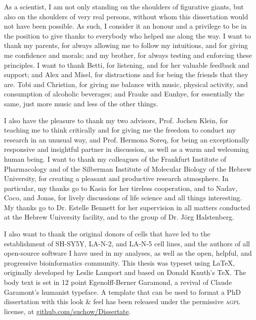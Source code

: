 
As a scientist, I am not only standing on the shoulders of figurative giants, but also on the shoulders of very real persons, without whom this dissertation would not have been possible. As such, I consider it an honour and a privilege to be in the position to give thanks to everybody who helped me along the way. I want to thank my parents, for always allowing me to follow my intuitions, and for giving me confidence and morals; and my brother, for always testing and enforcing these principles. I want to thank Betti, for listening, and for her valuable feedback and support; and Alex and Misel, for distractions and for being the friends that they are. Tobi and Christian, for giving me balance with music, physical activity, and consumption of alcoholic beverages; and Frauke and Eunhye, for essentially the same, just more music and less of the other things.

I also have the pleasure to thank my two advisors, Prof. Jochen Klein, for teaching me to think critically and for giving me the freedom to conduct my research in an unusual way, and Prof. Hermona Soreq, for being an exceptionally responsive and insightful partner in discussion, as well as a warm and welcoming human being. I want to thank my colleagues of the Frankfurt Institute of Pharmacology and of the Silberman Institute of Molecular Biology of the Hebrew University, for creating a pleasant and productive research atmosphere. In particular, my thanks go to Kasia for her tireless cooperation, and to Nadav, Coco, and Jonas, for lively discussions of life science and all things interesting. My thanks go to Dr. Estelle Bennett for her supervision in all matters conducted at the Hebrew University facility, and to the group of Dr. Jörg Halstenberg.

I also want to thank the original donors of cells that have led to the establishment of SH-SY5Y, LA-N-2, and LA-N-5 cell lines, and the authors of all open-source software I have used in my analyses, as well as the open, helpful, and progressive bioinformatics community. This thesis was typeset using \LaTeX, originally developed by Leslie Lamport and based on Donald Knuth's \TeX. The body text is set in 12 point Egenolff-Berner Garamond, a revival of Claude Garamont's humanist typeface. A template that can be used to format a PhD dissertation with this look \& feel has been released under the permissive \textsc{agpl} license, at \href{https://github.com/suchow/Dissertate}{github.com/suchow/Dissertate}.